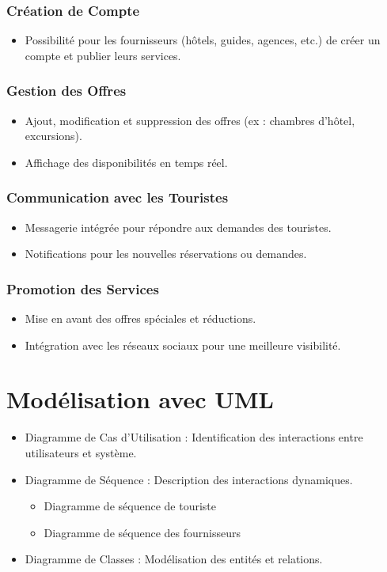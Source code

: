 \documentclass[12pt]{article}
\begin{document}
\subsubsection{Création de Compte}
\begin{itemize}
    \item Possibilité pour les fournisseurs (hôtels, guides, agences, etc.) de créer un compte et publier leurs services.
\end{itemize}

\subsubsection{Gestion des Offres}
\begin{itemize}
    \item Ajout, modification et suppression des offres (ex : chambres d’hôtel, excursions).
    \item Affichage des disponibilités en temps réel.
\end{itemize}

\subsubsection{Communication avec les Touristes}
\begin{itemize}
    \item Messagerie intégrée pour répondre aux demandes des touristes.
    \item Notifications pour les nouvelles réservations ou demandes.
\end{itemize}

\subsubsection{Promotion des Services}
\begin{itemize}
    \item Mise en avant des offres spéciales et réductions.
    \item Intégration avec les réseaux sociaux pour une meilleure visibilité.
\end{itemize}

\section{Modélisation avec UML}
\begin{itemize}
    \item Diagramme de Cas d’Utilisation : Identification des interactions entre utilisateurs et système.
    \item Diagramme de Séquence : Description des interactions dynamiques.
    \begin{itemize}
        \item Diagramme de séquence de touriste
        \item Diagramme de séquence des fournisseurs
    \end{itemize}
    \item Diagramme de Classes : Modélisation des entités et relations.
\end{itemize}
\end{document}
